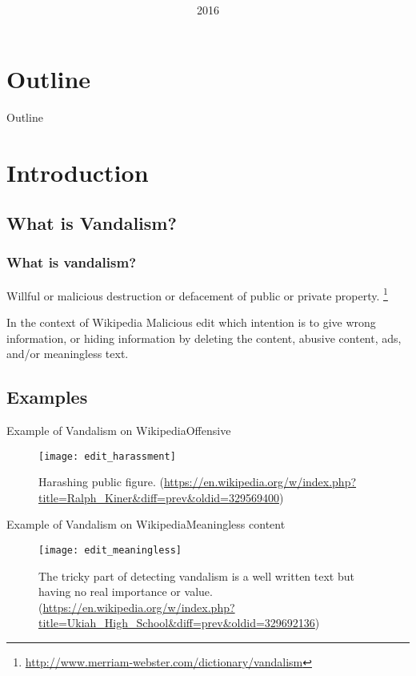 \documentclass{beamer}
\title[Detecting Vandalism with CRF]{%
	\mytitle
}
\author{\myname}
\institute[STEI-ITB]{%
	\mydept\\
	\itb
}
\date{2016}
\begin{document}
\frame{\titlepage}

\section*{Outline}
\begin{frame}
	{Outline}
	\begin{multicols}{2}
		\tableofcontents
	\end{multicols}
\end{frame}

\section{Introduction}

\subsection{What is Vandalism?}
\begin{frame}
	\frametitle{What is vandalism?}
	\begin{definition}
		Willful or malicious destruction or defacement of public or private
		property.
		\footnote{\url{http://www.merriam-webster.com/dictionary/vandalism}}
	\end{definition}
	\pause
	\begin{block}{In the context of Wikipedia}
		Malicious edit which intention is to give wrong information, or hiding
		information by deleting the content, abusive content, ads, and/or
		meaningless text.
	\end{block}
\end{frame}

\subsection{Examples}
\begin{frame}{Example of Vandalism on Wikipedia}{Offensive}
	\begin{figure}
		\centering
		\texttt{[image: edit\_harassment]}
		\caption{
			Harashing public figure.
			(\url{https://en.wikipedia.org/w/index.php?title=Ralph_Kiner&diff=prev&oldid=329569400})
		}
	\end{figure}
\end{frame}

\begin{frame}{Example of Vandalism on Wikipedia}{Meaningless content}
	\begin{figure}
		\centering
		\texttt{[image: edit\_meaningless]}
		\caption{
			The tricky part of detecting vandalism is a well written text but
			having no real importance or value.
			(\url{https://en.wikipedia.org/w/index.php?title=Ukiah_High_School&diff=prev&oldid=329692136})
		}
	\end{figure}
\end{frame}
\end{document}
